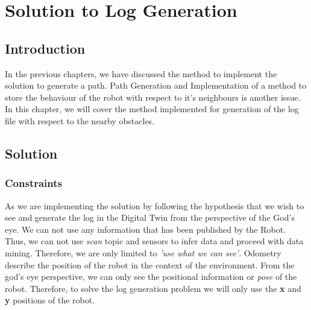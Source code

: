 
\chapter{Solution to Log Generation} %

\label{Chapter4} %

\section{Introduction}
In the previous chapters, we have discussed the method to implement the solution to generate a path. Path Generation and Implementation of a method to store the behaviour of the robot with respect to it's neighbours is another issue.
In this chapter, we will cover the method implemented for generation of the log file with respect to the nearby obstacles. 

\section{Solution}

\subsection{Constraints}
As we are implementing the solution by following the hypothesis that we wish to see and generate the log in the Digital Twin from the perspective of the God's eye.
We can not use any information that has been published by the Robot. Thus, we can not use \textit{scan} topic and sensors to infer data and proceed with data mining.
Therefore, we are only limited to \textit{'use what we can see'}. Odometry describe the position of the robot in the context of the environment. From the god's eye perspective,
we can only see the positional information or \textit{pose} of the robot. Therefore, to solve the log generation problem we will only use the \textbf{x} and \textbf{y} positions of the robot.

